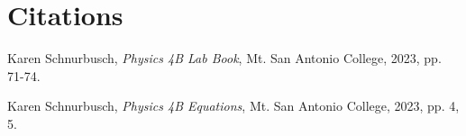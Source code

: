 \documentclass[12pt]{iopart} %
\begin{document}
\section{Citations}

\begin{thebibliography}{9}

  Karen Schnurbusch,
  \textit{Physics 4B Lab Book},
  Mt. San Antonio College,
  2023,
  pp. 71-74.

  Karen Schnurbusch,
  \textit{Physics 4B Equations},
  Mt. San Antonio College,
  2023,
  pp. 4, 5.

\end{thebibliography}
\end{document}
